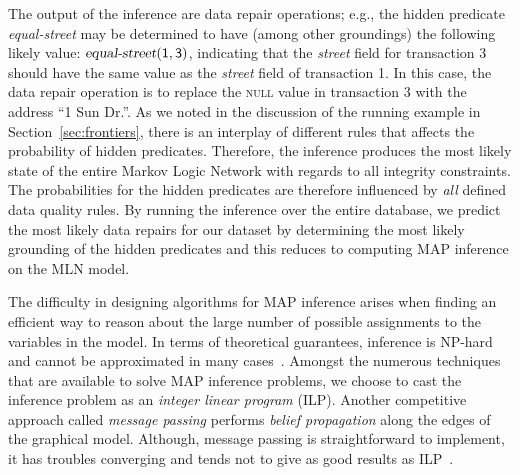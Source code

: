 The output of the inference are data repair operations; e.g., the hidden predicate \textsl{equal-street} may be determined to have (among other groundings) the following likely value: $\mathsf{\textsl{equal-street}(1, 3)}$, indicating that the \textsl{street} field for transaction 3 should have the same value as the \textsl{street} field of transaction 1. In this case, the data repair operation is to replace the \textsc{null} value in transaction 3 with the address ``1 Sun Dr.''. 
As we noted in the discussion of the running example in Section~\ref{sec:frontiers}, there is an interplay of different rules that affects the probability of hidden predicates. Therefore, the inference produces the most likely state of the entire Markov Logic Network with regards to all integrity constraints. The probabilities for the hidden predicates are therefore influenced by \textit{all} defined data quality rules. By running the inference over the entire database, we predict the most likely data repairs for our dataset by determining the most likely grounding of the hidden predicates and this reduces to computing \textsc{MAP} inference on the MLN model.      

The difficulty in designing algorithms for MAP inference arises when finding an efficient way to reason about the large number of possible assignments to the variables in the model. In terms of theoretical guarantees, inference is NP-hard and cannot be approximated in many cases~\cite{Shimony1994}. Amongst the numerous techniques that are available to solve MAP inference problems, we choose to cast the inference problem as an \emph{integer linear program} (ILP)\cite{Sontag10approximateinference}. Another competitive approach called \emph{message passing} performs \emph{belief propagation} along the edges of the graphical model. Although, message passing is straightforward to implement, it has troubles converging \cite{schwing2011distributed, felzenszwalb2006efficient, pritch2009shift} and tends not to give as good results as ILP~\cite{NoessnerNS13}. 

